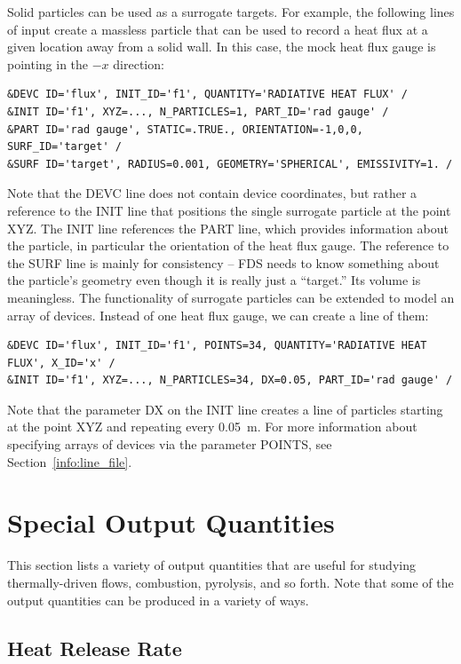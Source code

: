 \documentclass[11pt]{book}
\begin{document}
Solid particles can be used as a surrogate targets. For example, the following lines of input create a massless particle that can be used to record a heat flux at a given location away from a solid wall. In this case, the mock heat flux gauge is pointing in the $-x$ direction:
\begin{lstlisting}
&DEVC ID='flux', INIT_ID='f1', QUANTITY='RADIATIVE HEAT FLUX' /
&INIT ID='f1', XYZ=..., N_PARTICLES=1, PART_ID='rad gauge' /
&PART ID='rad gauge', STATIC=.TRUE., ORIENTATION=-1,0,0, SURF_ID='target' /
&SURF ID='target', RADIUS=0.001, GEOMETRY='SPHERICAL', EMISSIVITY=1. /
\end{lstlisting}
Note that the {\ct DEVC} line does not contain device coordinates, but rather a reference to the {\ct INIT} line that positions the single surrogate particle at the point {\ct XYZ}. The {\ct INIT} line references the {\ct PART} line, which provides information about the particle, in particular the orientation of the heat flux gauge. The reference to the {\ct SURF} line is mainly for consistency -- FDS needs to know something about the particle's geometry even though it is really just a ``target.''  Its volume is meaningless. The functionality of surrogate particles can be extended to model an array of devices. Instead of one heat flux gauge, we can create a line of them:
\begin{lstlisting}
&DEVC ID='flux', INIT_ID='f1', POINTS=34, QUANTITY='RADIATIVE HEAT FLUX', X_ID='x' /
&INIT ID='f1', XYZ=..., N_PARTICLES=34, DX=0.05, PART_ID='rad gauge' /
\end{lstlisting}
Note that the parameter {\ct DX} on the {\ct INIT} line creates a line of particles starting at the point {\ct XYZ} and repeating every 0.05~m. For more information about specifying arrays of devices via the parameter {\ct POINTS}, see Section~\ref{info:line_file}.





\section{Special Output Quantities}

This section lists a variety of output quantities that are useful for studying thermally-driven flows, combustion, pyrolysis, and so forth. Note that some of the output quantities can be produced in a variety of ways.


\subsection{Heat Release Rate}
\label{info:HRR}
\label{hallways}
\end{document}
